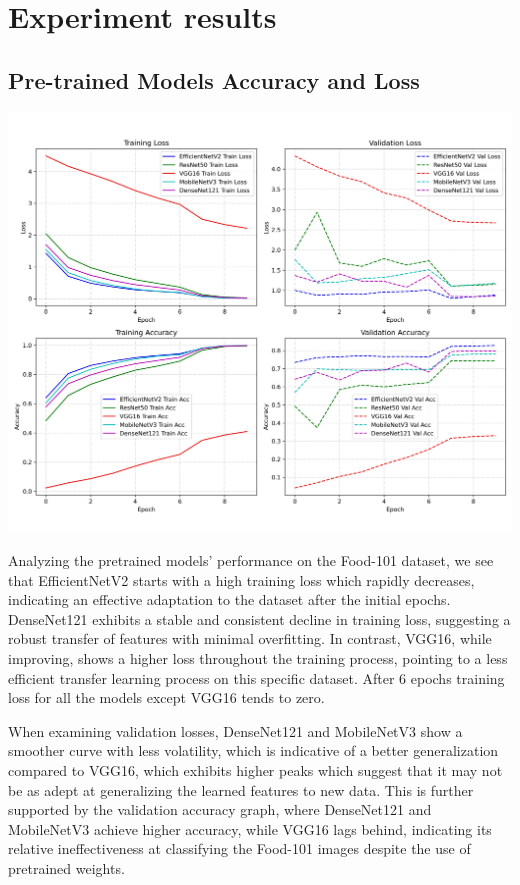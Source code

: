 \documentclass{article}
\begin{document}
\section{Experiment results}

\subsection*{Pre-trained Models Accuracy and Loss}

\begin{center}
    \includegraphics[width=1\linewidth]{./images/pt_models.jpg}
\end{center}

Analyzing the pretrained models' performance on the Food-101 dataset, we see that EfficientNetV2 starts with a high training loss which rapidly decreases, indicating an effective adaptation to the dataset after the initial epochs. DenseNet121 exhibits a stable and consistent decline in training loss, suggesting a robust transfer of features with minimal overfitting. In contrast, VGG16, while improving, shows a higher loss throughout the training process, pointing to a less efficient transfer learning process on this specific dataset. After 6 epochs training loss for all the models except VGG16 tends to zero.

When examining validation losses, DenseNet121 and MobileNetV3 show a smoother curve with less volatility, which is indicative of a better generalization compared to VGG16, which exhibits higher peaks which suggest that it may not be as adept at generalizing the learned features to new data. This is further supported by the validation accuracy graph, where DenseNet121 and MobileNetV3 achieve higher accuracy, while VGG16 lags behind, indicating its relative ineffectiveness at classifying the Food-101 images despite the use of pretrained weights.
\end{document}
